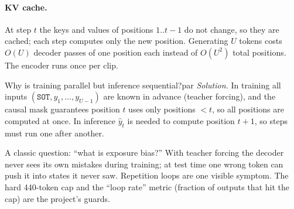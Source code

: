 \paragraph{KV cache.} At step $t$ the keys and values of positions $1..t-1$ do not change, so they are cached; each step computes
only the new position. Generating $U$ tokens costs $O(U)$ decoder passes of one position each instead of $O(U^2)$ total positions.
The encoder runs once per clip.

\begin{exercise}{Why is training parallel but inference sequential?}{par}
\textit{Solution.} In training all inputs $(\texttt{SOT},y_1,\dots,y_{U-1})$ are known in advance (teacher forcing), and the causal
mask guarantees position $t$ uses only positions $<t$, so all positions are computed at once. In inference $\hat y_t$ is needed to
compute position $t+1$, so steps must run one after another.
\end{exercise}

\begin{vivatip}
A classic question: ``what is exposure bias?'' With teacher forcing the decoder never sees its own mistakes during training; at test
time one wrong token can push it into states it never saw. Repetition loops are one visible symptom. The hard 440-token cap and the
``loop rate'' metric (fraction of outputs that hit the cap) are the project's guards.
\end{vivatip}
